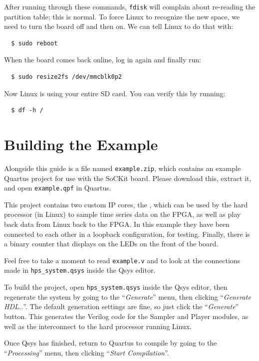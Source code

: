 \documentclass{sockitguide}
\begin{document}
After running through these commands, \texttt{fdisk} will complain
about re-reading the partition table; this is normal. To force Linux
to recognize the new space, we need to turn the board off and then
on. We can tell Linux to do that with:
\begin{verbatim}
  $ sudo reboot
\end{verbatim}

When the board comes back online, log in again and finally run:
\begin{verbatim}
  $ sudo resize2fs /dev/mmcblk0p2
\end{verbatim}

Now Linux is using your entire SD card. You can verify this by running:
\begin{verbatim}
  $ df -h /
\end{verbatim}

\section{Building the Example}

Alongside this guide is a file named \texttt{example.zip}, which
contains an example Quartus project for use with the SoCKit
board. Please download this, extract it, and open \texttt{example.qpf}
in Quartus.

This project contains two custom IP cores, the , which can be used
by the hard processor (in Linux) to sample time series data on the
FPGA, as well as play back data from Linux back to the FPGA. In this
example they have been connected to each other in a loopback
configuration, for testing. Finally, there is a binary counter that
displays on the LEDs on the front of the board.

Feel free to take a moment to read \texttt{example.v} and to look at
the connections made in \texttt{hps\_system.qsys} inside the Qsys
editor.

To build the project, open \texttt{hps\_system.qsys} inside the Qsys
editor, then regenerate the system by going to the
``\textit{Generate}'' menu, then clicking ``\textit{Generate
  HDL..}''. The default generation settings are fine, so just click
the ``\textit{Generate}'' button. This generates the Verilog code for
the Sampler and Player modules, as well as the interconnect to the
hard processor running Linux.

Once Qsys has finished, return to Quartus to compile by going to the
``\textit{Processing}'' menu, then clicking ``\textit{Start
  Compilation}''.
\end{document}
